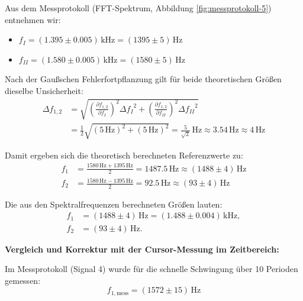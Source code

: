 \documentclass[12pt,a4paper,titlepage]{scrartcl}
\numberwithin{equation}{section}
\numberwithin{table}{section}
\numberwithin{figure}{section}
\begin{document}
\medskip
Aus dem Messprotokoll (FFT-Spektrum, Abbildung \ref{fig:messprotokoll-5}) entnehmen wir:
\begin{itemize}
    \item $f_I = (1.395 \pm 0.005)\,\text{kHz} = (1395 \pm 5)\,\text{Hz}$
    \item $f_{II} = (1.580 \pm 0.005)\,\text{kHz} = (1580 \pm 5)\,\text{Hz}$
\end{itemize}

Nach der Gaußschen Fehlerfortpflanzung gilt für beide theoretischen Größen dieselbe Unsicherheit:
\begin{equation}
    \begin{aligned}
        \Delta{f_{1,2}} &= \sqrt{\left(\frac{\partial f_{1,2}}{\partial f_I}\right)^2 \Delta{f_I}^2 + \left(\frac{\partial f_{1,2}}{\partial f_{II}}\right)^2 \Delta{f_{II}}^2} \\
        &= \frac{1}{2} \sqrt{(5\,\text{Hz})^2 + (5\,\text{Hz})^2} = \frac{5}{\sqrt{2}}\,\text{Hz} \approx 3.54\,\text{Hz} \approx 4\,\text{Hz}
    \end{aligned}
\end{equation}

Damit ergeben sich die theoretisch berechneten Referenzwerte zu:
\begin{align*}
    f_1 &= \frac{1580\,\text{Hz} + 1395\,\text{Hz}}{2} = 1487.5\,\text{Hz} \approx (1488 \pm 4)\,\text{Hz} \\
    f_2 &= \frac{1580\,\text{Hz} - 1395\,\text{Hz}}{2} = 92.5\,\text{Hz} \approx (93 \pm 4)\,\text{Hz}
\end{align*}

\begin{resultbox}
    Die aus den Spektralfrequenzen berechneten Größen lauten:
    \begin{align*}
        f_1 &= (1488 \pm 4)\,\text{Hz} = (1.488 \pm 0.004)\,\text{kHz}, \\
        f_2 &= (93 \pm 4)\,\text{Hz}.
    \end{align*}
\end{resultbox}

\medskip
\textbf{Vergleich und Korrektur mit der Cursor-Messung im Zeitbereich:}

Im Messprotokoll (Signal 4) wurde für die schnelle Schwingung über 10 Perioden gemessen:
\begin{equation*}
    f_{1,\text{mess}} = (1572 \pm 15)\,\text{Hz}
\end{equation*}
\end{document}
